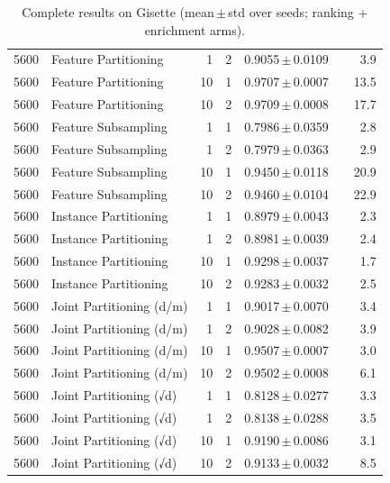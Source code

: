 \begin{table}[ht]
\begin{tabular}{rlrrccr}
5600 & Feature Partitioning & 1 & 2 & 0.9055\,$\pm$\,0.0109 &  & 3.9 \\
5600 & Feature Partitioning & 10 & 1 & 0.9707\,$\pm$\,0.0007 &  & 13.5 \\
5600 & Feature Partitioning & 10 & 2 & 0.9709\,$\pm$\,0.0008 &  & 17.7 \\
5600 & Feature Subsampling & 1 & 1 & 0.7986\,$\pm$\,0.0359 &  & 2.8 \\
5600 & Feature Subsampling & 1 & 2 & 0.7979\,$\pm$\,0.0363 &  & 2.9 \\
5600 & Feature Subsampling & 10 & 1 & 0.9450\,$\pm$\,0.0118 &  & 20.9 \\
5600 & Feature Subsampling & 10 & 2 & 0.9460\,$\pm$\,0.0104 &  & 22.9 \\
5600 & Instance Partitioning & 1 & 1 & 0.8979\,$\pm$\,0.0043 &  & 2.3 \\
5600 & Instance Partitioning & 1 & 2 & 0.8981\,$\pm$\,0.0039 &  & 2.4 \\
5600 & Instance Partitioning & 10 & 1 & 0.9298\,$\pm$\,0.0037 &  & 1.7 \\
5600 & Instance Partitioning & 10 & 2 & 0.9283\,$\pm$\,0.0032 &  & 2.5 \\
5600 & Joint Partitioning (d/m) & 1 & 1 & 0.9017\,$\pm$\,0.0070 &  & 3.4 \\
5600 & Joint Partitioning (d/m) & 1 & 2 & 0.9028\,$\pm$\,0.0082 &  & 3.9 \\
5600 & Joint Partitioning (d/m) & 10 & 1 & 0.9507\,$\pm$\,0.0007 &  & 3.0 \\
5600 & Joint Partitioning (d/m) & 10 & 2 & 0.9502\,$\pm$\,0.0008 &  & 6.1 \\
5600 & Joint Partitioning (√d) & 1 & 1 & 0.8128\,$\pm$\,0.0277 &  & 3.3 \\
5600 & Joint Partitioning (√d) & 1 & 2 & 0.8138\,$\pm$\,0.0288 &  & 3.5 \\
5600 & Joint Partitioning (√d) & 10 & 1 & 0.9190\,$\pm$\,0.0086 &  & 3.1 \\
5600 & Joint Partitioning (√d) & 10 & 2 & 0.9133\,$\pm$\,0.0032 &  & 8.5 \\
\bottomrule
\end{tabular}
\caption{Complete results on Gisette (mean\,$\pm$\,std over seeds; ranking + enrichment arms).}
\label{tab:app_gisette}
\end{table}
